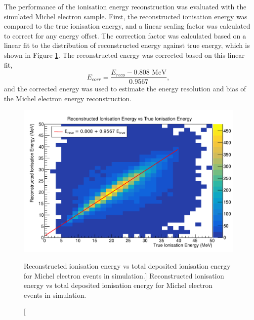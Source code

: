 The performance of the ionisation energy reconstruction was evaluated with the
simulated Michel electron sample. First, the reconstructed ionisation energy was
compared to the true ionisation energy, and a linear scaling factor was
calculated to correct for any energy offset. The correction factor was
calculated based on a linear fit to the distribution of reconstructed energy
against true energy, which is shown in Figure \ref{fig:reco_v_ion}. The
reconstructed energy was corrected based on this linear fit, 
\begin{equation*}
	E_{corr} = \frac{E_{reco}  - 0.808 \mbox{ MeV}}{0.9567},
\end{equation*}
and the corrected energy was used to estimate the energy resolution and bias of
the Michel electron energy reconstruction.
\begin{figure}
	\centering
	\includegraphics[width=\textwidth]{figures/reco_v_true_ion.pdf}
	\caption
	[Reconstructed ionisation energy vs total deposited ionisation energy for
	Michel electron events in \protodune{} simulation.]
	{ Reconstructed ionisation energy vs total deposited ionisation energy for
	Michel electron events in \protodune{} simulation. }
	\label{fig:reco_v_ion}
\end{figure}


